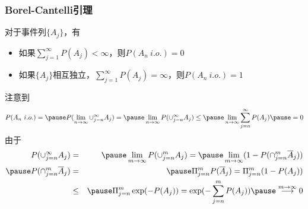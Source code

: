 \begin{frame}
  \frametitle{Borel-Cantelli引理}
  \begin{thm}
    对于事件列$\{A_j\}$，有
    \begin{itemize}[<+-|alert@+>]
    \item 如果$\sum_{j=1}^\infty P(A_j)<\infty$，则$P(A_n\ i.o.)=0$
    \item 如果$\{A_j\}$相互独立，$\sum_{j=1}^\infty P(A_j)=\infty$，则$P(A_n\ i.o.)=1$
    \end{itemize}
  \end{thm}\pause
  \zheng 注意到
  \begin{eqnarray*}
    P(A_n\ i.o.)=\pause P(\lim_{n\rightarrow\infty} \cup_{j=n}^\infty A_j)=\pause \lim_{n\rightarrow\infty} P(\cup_{j=n}^\infty A_j)\le \pause \lim_{n\rightarrow\infty}\sum_{j=n}^\infty P(A_j)\pause =0
  \end{eqnarray*}
  \pause
  由于\pause
  \begin{eqnarray*}
    P(\cup_{j=n}^\infty A_j)&=&\pause \lim_{m\rightarrow\infty}P(\cup_{j=n}^m A_j)=\pause \lim_{m\rightarrow\infty}(1-P(\cap_{j=n}^m\overline{A}_j))\\\pause
    P(\cap_{j=n}^m\overline{A}_j)&=&\pause \Pi_{j=n}^m P(\overline{A}_j)=\Pi_{j=n}^m(1-P(A_j))\\
                            &\le&\pause \Pi_{j=n}^m \exp(-P(A_j))=\exp(-\sum_{j=n}^m P(A_j))\pause \stackrel{m\rightarrow\infty}{\longrightarrow} 0
  \end{eqnarray*}

\end{frame}






